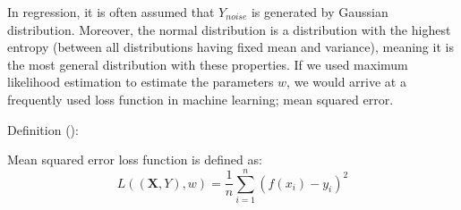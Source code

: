 In regression, it is often assumed that $Y_{noise}$ is generated by Gaussian distribution. Moreover, the normal distribution is a distribution with the highest entropy (between all distributions having fixed mean and variance), meaning it is the most general distribution with these properties. If we used maximum likelihood estimation to estimate the parameters $w$, we would arrive at a frequently used loss function in machine learning; mean squared error.

Definition (): 

\begin{defn}\label{def01:5}
	Mean squared error loss function is defined as:
	\begin{equation}
		L((\textbf{X}, Y), w) = \frac{1}{n} \sum_{i=1}^n (f(x_i) - y_i)^2
	\end{equation}
\end{defn}

